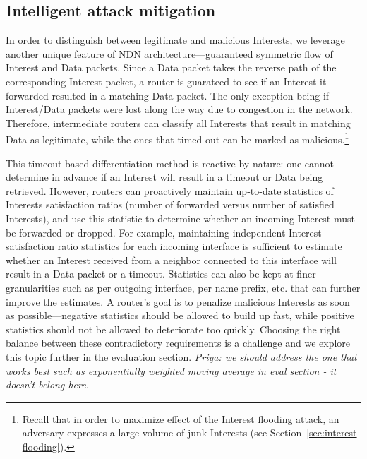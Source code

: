 
\subsection{Intelligent attack mitigation}
\label{sec:intelligent mitigating}


In order to distinguish between legitimate and malicious Interests, we leverage another unique feature of  NDN architecture---guaranteed symmetric flow of Interest and Data packets. Since a Data packet takes the reverse path of the corresponding Interest packet, a router is guarateed to see if an Interest it forwarded resulted in a matching Data packet. The only exception being if Interest/Data packets were lost along the way due to congestion in the network.
Therefore, intermediate routers can classify all Interests that result in matching Data as legitimate, while the ones that timed out can be marked as malicious.\footnote{Recall that in order to maximize effect of the Interest flooding attack, an adversary expresses a large volume of junk Interests (see Section~\ref{sec:interest flooding}).}  

This timeout-based differentiation method is reactive by nature: one cannot determine in advance if an Interest will result in a timeout or Data being retrieved. However, routers can proactively maintain up-to-date statistics of Interests satisfaction ratios (number of forwarded versus number of satisfied Interests), and use this statistic to determine whether an incoming Interest must be forwarded or dropped. For example, maintaining independent Interest satisfaction ratio statistics for each incoming interface is sufficient to estimate whether an Interest received from a neighbor connected to this interface will result in a Data packet or a timeout. Statistics can also be kept at finer granularities such as per outgoing interface, per name prefix, etc. that can further improve the estimates. A router's goal is to penalize malicious Interests as soon as possible---negative statistics should be allowed to build up fast, while positive statistics should not be allowed to deteriorate too quickly. Choosing the right balance between these contradictory requirements is a challenge and we explore this topic further  in the evaluation section.  {\color{red} \it Priya: we should address the one that works best such as exponentially weighted moving average in eval section - it doesn't belong here.} 

